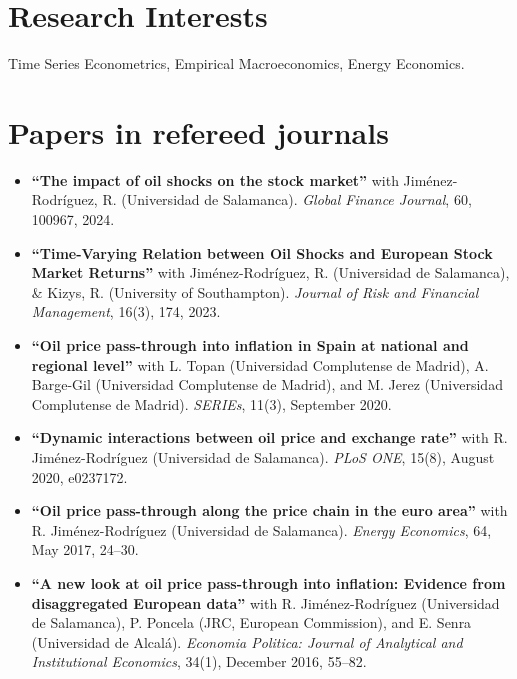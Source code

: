\documentclass[11pt]{article}\usepackage[]{graphicx}\usepackage[usenames,dvipsnames]{xcolor}
\begin{document}
{%
\section{Research Interests}
Time Series Econometrics, Empirical Macroeconomics, Energy Economics.\\

\section{Papers in refereed journals}
\begin{itemize}

\item \textbf{``The impact of oil shocks on the stock market''} with Jiménez-Rodríguez, R. (Universidad de Salamanca). \emph{Global Finance Journal}, 60, 100967, 2024.

\item \textbf{``Time-Varying Relation between Oil Shocks and European Stock Market Returns''} with Jiménez-Rodríguez, R. (Universidad de Salamanca), & Kizys, R. (University of Southampton). \emph{Journal of Risk and Financial Management}, 16(3), 174, 2023.

  \item \textbf{``Oil price pass-through into inflation in Spain at national and regional level''} with L. Topan (Universidad Complutense de Madrid), A. Barge-Gil (Universidad Complutense de Madrid), and M. Jerez (Universidad Complutense de Madrid). \emph{SERIEs}, 11(3), September 2020.

  \item \textbf{``Dynamic interactions between oil price and exchange rate''} with R. Jiménez-Rodríguez (Universidad de Salamanca). \emph{PLoS ONE}, 15(8), August 2020,  e0237172.

  \item \textbf{``Oil price pass-through along the price chain in the euro area''} with R. Jiménez-Rodríguez (Universidad de Salamanca). \emph{Energy Economics}, 64, May 2017, 24--30.

  \item \textbf{``A new look at oil price pass-through into inflation: Evidence from disaggregated European data''} with R. Jiménez-Rodríguez (Universidad de Salamanca), P. Poncela (JRC, European Commission), and E. Senra (Universidad de Alcalá). \emph{Economia Politica: Journal of Analytical and Institutional Economics}, 34(1), December 2016, 55--82.


\end{itemize}}
\end{document}
